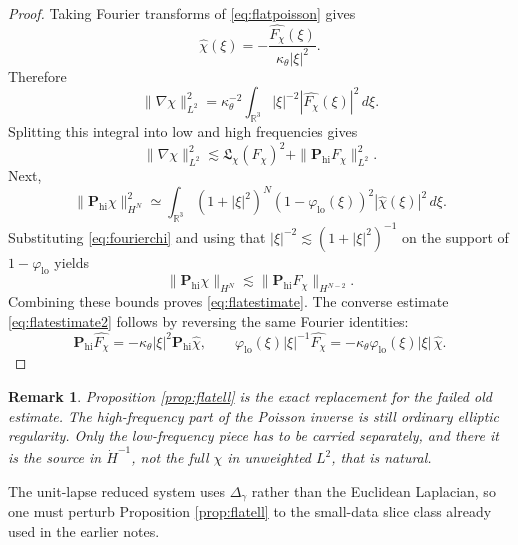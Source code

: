 \documentclass[11pt]{article}
\newtheorem{remark}{Remark}
\begin{document}
\begin{proof}
Taking Fourier transforms of \eqref{eq:flatpoisson} gives
\begin{equation}
\widehat\chi(\xi)
=
-\frac{\widehat{F_\chi}(\xi)}{\kappa_\theta |\xi|^2}.
\label{eq:fourierchi}
\end{equation}
Therefore
\[
\|\nabla\chi\|_{L^2}^2
=
\kappa_\theta^{-2}\int_{\mathbb R^3}
|\xi|^{-2}|\widehat{F_\chi}(\xi)|^2\,d\xi.
\]
Splitting this integral into low and high frequencies gives
\[
\|\nabla\chi\|_{L^2}^2
\lesssim
\mathfrak L_\chi(F_\chi)^2
+ \|\mathbf P_{\mathrm{hi}}F_\chi\|_{L^2}^2.
\]
Next,
\[
\|\mathbf P_{\mathrm{hi}}\chi\|_{H^N}^2
\simeq
\int_{\mathbb R^3}
(1+|\xi|^2)^N(1-\varphi_{\mathrm{lo}}(\xi))^2
|\widehat\chi(\xi)|^2\,d\xi.
\]
Substituting \eqref{eq:fourierchi} and using that \(|\xi|^{-2}\lesssim (1+|\xi|^2)^{-1}\) on the support of \(1-\varphi_{\mathrm{lo}}\) yields
\[
\|\mathbf P_{\mathrm{hi}}\chi\|_{H^N}
\lesssim
\|\mathbf P_{\mathrm{hi}}F_\chi\|_{H^{N-2}}.
\]
Combining these bounds proves \eqref{eq:flatestimate}. The converse estimate \eqref{eq:flatestimate2} follows by reversing the same Fourier identities:
\[
\mathbf P_{\mathrm{hi}}\widehat{F_\chi}
=
-\kappa_\theta |\xi|^2 \mathbf P_{\mathrm{hi}}\widehat\chi,
\qquad
\varphi_{\mathrm{lo}}(\xi)|\xi|^{-1}\widehat{F_\chi}
=
-\kappa_\theta \varphi_{\mathrm{lo}}(\xi)|\xi|\,\widehat\chi.
\]
\end{proof}

\begin{remark}
Proposition \ref{prop:flatell} is the exact replacement for the failed old estimate. The high-frequency part of the Poisson inverse is still ordinary elliptic regularity. Only the low-frequency piece has to be carried separately, and there it is the source in \(\dot H^{-1}\), not the full \(\chi\) in unweighted \(L^2\), that is natural.
\end{remark}

The unit-lapse reduced system uses \(\Delta_\gamma\) rather than the Euclidean Laplacian, so one must perturb Proposition \ref{prop:flatell} to the small-data slice class already used in the earlier notes.
\end{document}
